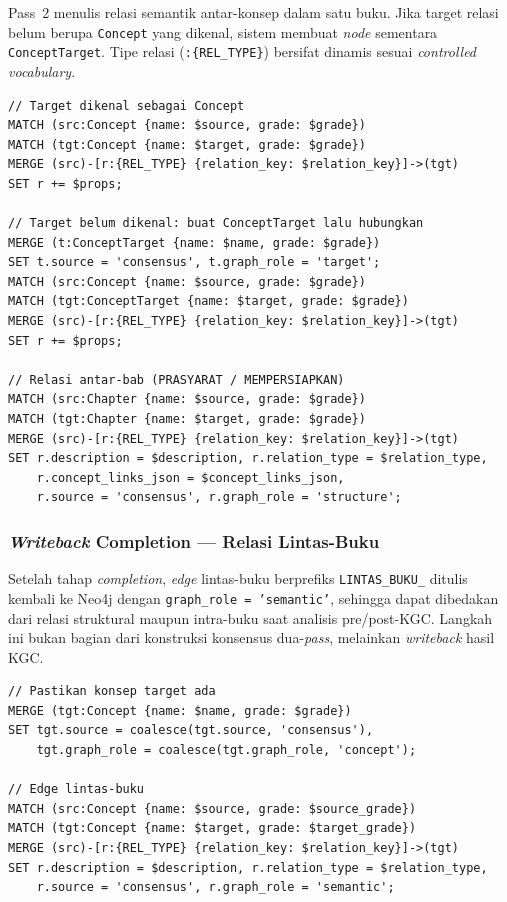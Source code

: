 \documentclass[../../thesis]{subfiles}
\begin{document}
Pass~2 menulis relasi semantik antar-konsep dalam satu buku. Jika target
relasi belum berupa \texttt{Concept} yang dikenal, sistem membuat
\textit{node} sementara \texttt{ConceptTarget}. Tipe relasi
(\texttt{:\{REL\_TYPE\}}) bersifat dinamis sesuai \textit{controlled vocabulary}.

\begin{lstlisting}[style=cypherbox,caption={Relasi intra-buku konsep-ke-konsep dan konsep-ke-target (Pass~2).},label={lst:cypher-pass2}]
// Target dikenal sebagai Concept
MATCH (src:Concept {name: $source, grade: $grade})
MATCH (tgt:Concept {name: $target, grade: $grade})
MERGE (src)-[r:{REL_TYPE} {relation_key: $relation_key}]->(tgt)
SET r += $props;

// Target belum dikenal: buat ConceptTarget lalu hubungkan
MERGE (t:ConceptTarget {name: $name, grade: $grade})
SET t.source = 'consensus', t.graph_role = 'target';
MATCH (src:Concept {name: $source, grade: $grade})
MATCH (tgt:ConceptTarget {name: $target, grade: $grade})
MERGE (src)-[r:{REL_TYPE} {relation_key: $relation_key}]->(tgt)
SET r += $props;

// Relasi antar-bab (PRASYARAT / MEMPERSIAPKAN)
MATCH (src:Chapter {name: $source, grade: $grade})
MATCH (tgt:Chapter {name: $target, grade: $grade})
MERGE (src)-[r:{REL_TYPE} {relation_key: $relation_key}]->(tgt)
SET r.description = $description, r.relation_type = $relation_type,
    r.concept_links_json = $concept_links_json,
    r.source = 'consensus', r.graph_role = 'structure';
\end{lstlisting}

\subsubsection{\textit{Writeback} Completion --- Relasi Lintas-Buku}

Setelah tahap \textit{completion}, \textit{edge} lintas-buku berprefiks
\texttt{LINTAS\_BUKU\_} ditulis kembali ke Neo4j dengan
\texttt{graph\_role = 'semantic'}, sehingga dapat dibedakan dari relasi
struktural maupun intra-buku saat analisis pre/post-KGC. Langkah ini bukan
bagian dari konstruksi konsensus dua-\textit{pass}, melainkan \textit{writeback}
hasil KGC.

\begin{lstlisting}[style=cypherbox,caption={Penulisan edge lintas-buku hasil completion.},label={lst:cypher-completion-writeback}]
// Pastikan konsep target ada
MERGE (tgt:Concept {name: $name, grade: $grade})
SET tgt.source = coalesce(tgt.source, 'consensus'),
    tgt.graph_role = coalesce(tgt.graph_role, 'concept');

// Edge lintas-buku
MATCH (src:Concept {name: $source, grade: $source_grade})
MATCH (tgt:Concept {name: $target, grade: $target_grade})
MERGE (src)-[r:{REL_TYPE} {relation_key: $relation_key}]->(tgt)
SET r.description = $description, r.relation_type = $relation_type,
    r.source = 'consensus', r.graph_role = 'semantic';
\end{lstlisting}
\end{document}
